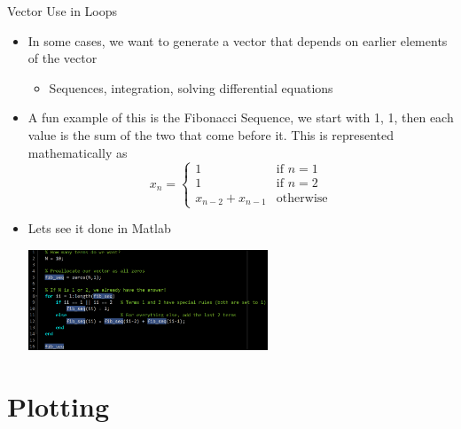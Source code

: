 {}\documentclass[letterpaper,
compress,
xcolor=x11names,
]{beamer}
\begin{document}

\begin{frame}{Vector Use in Loops}
	\footnotesize
	\begin{itemize}
		\item In some cases, we want to generate a vector that depends on earlier elements of the vector
		\begin{itemize}
			\item Sequences, integration, solving differential equations
		\end{itemize}
		\item A fun example of this is the Fibonacci Sequence, we start with 1, 1, then each value is the sum of the two that come before it. This is represented mathematically as 
		\begin{equation*}
			x_n =  \begin{cases}
				1 & \text{if } n=1 \\
				1 & \text{if } n=2 \\
				x_{n-2} + x_{n-1} & \text{otherwise}
			\end{cases}
		\end{equation*}
		\item Lets see it done in Matlab
		\begin{center}
			\includegraphics[height = 3cm]{fib_seq.png}
		\end{center}
	\end{itemize}
\end{frame}

\section{Plotting}
\end{document}
